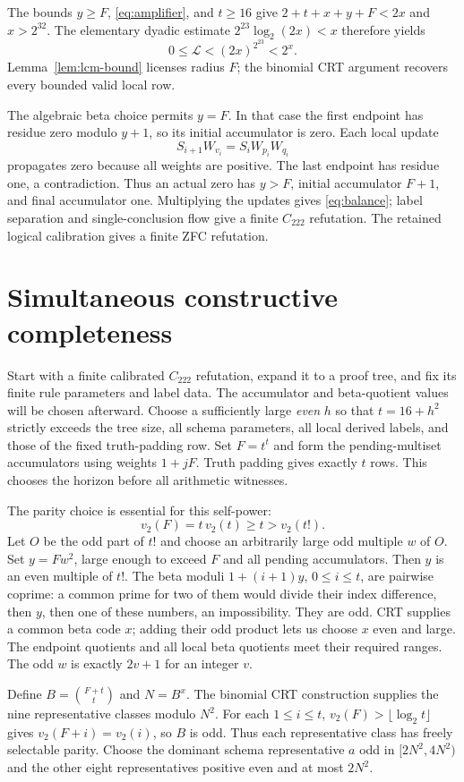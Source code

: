 \documentclass[11pt]{article}
\theoremstyle{definition}
\newcommand{\LL}{\mathcal L}
\newcommand{\calC}{C_{222}}
\begin{document}
The bounds $y\ge F$, \eqref{eq:amplifier}, and $t\ge16$ give
$2+t+x+y+F<2x$ and $x>2^{32}$. The elementary dyadic estimate
$2^{23}\log_2(2x)<x$ therefore yields
\[
0\le\LL<(2x)^{2^{23}}<2^x.
\]
Lemma~\ref{lem:lcm-bound} licenses radius $F$; the binomial CRT
argument recovers every bounded valid local row.

The algebraic beta choice permits $y=F$. In that case the first
endpoint has residue zero modulo $y+1$, so its initial accumulator
is zero. Each local update
\[
S_{i+1}W_{v_i}=S_iW_{p_i}W_{q_i}
\]
propagates zero because all weights are positive. The last endpoint
has residue one, a contradiction. Thus an actual zero has $y>F$,
initial accumulator $F+1$, and final accumulator one. Multiplying
the updates gives \eqref{eq:balance}; label separation and
single-conclusion flow give a finite $\calC$ refutation. The retained
logical calibration gives a finite ZFC refutation.

\section{Simultaneous constructive completeness}
\label{sec:complete}

Start with a finite calibrated $\calC$ refutation, expand it to a proof
tree, and fix its finite rule parameters and label data. The accumulator
and beta-quotient values will be chosen afterward. Choose a sufficiently large
\emph{even} $h$ so that $t=16+h^2$ strictly exceeds the tree size,
all schema parameters, all local derived labels, and those of the
fixed truth-padding row. Set $F=t^t$ and form the pending-multiset
accumulators using weights $1+jF$. Truth padding gives exactly $t$
rows. This chooses the horizon before all arithmetic witnesses.

The parity choice is essential for this self-power:
\[
v_2(F)=t\,v_2(t)\ge t>v_2(t!).
\]
Let $O$ be the odd part of $t!$ and choose an arbitrarily large odd
multiple $w$ of $O$. Set $y=Fw^2$, large enough to exceed $F$ and
all pending accumulators. Then $y$ is an even multiple of $t!$.
The beta moduli $1+(i+1)y$, $0\le i\le t$, are pairwise coprime:
a common prime for two of them would divide their index difference,
then $y$, then one of these numbers, an impossibility. They are odd.
CRT supplies a common beta code $x$; adding their odd product lets
us choose $x$ even and large. The endpoint quotients and all local
beta quotients meet their required ranges. The odd $w$ is exactly
$2v+1$ for an integer $v$.

Define $B=\binom{F+t}{t}$ and $N=B^x$. The binomial CRT construction
supplies the nine representative classes modulo $N^2$. For each
$1\le i\le t$, $v_2(F)>\lfloor\log_2t\rfloor$ gives
$v_2(F+i)=v_2(i)$, so $B$ is odd. Thus each representative class
has freely selectable parity. Choose the dominant schema
representative $a$ odd in $[2N^2,4N^2)$ and the other eight
representatives positive even and at most $2N^2$.
\end{document}
